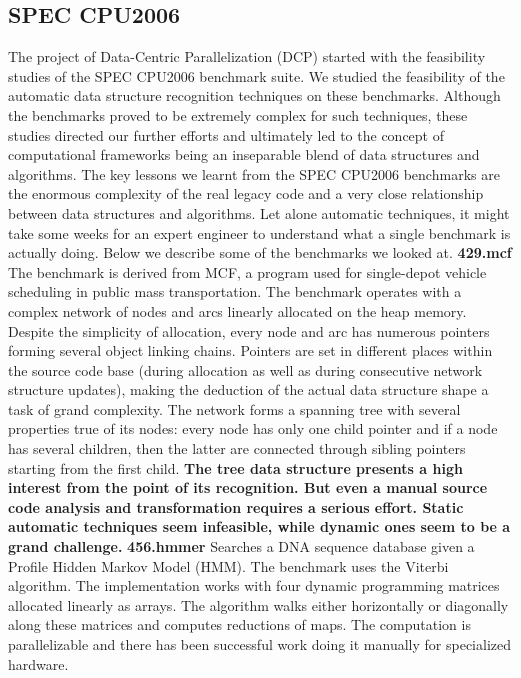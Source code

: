 \subsection{SPEC CPU2006}
\label{background_benchmarks_spec}
\quad The project of Data-Centric Parallelization (DCP) started with the feasibility studies of the SPEC CPU2006 benchmark suite. We studied the feasibility of the automatic data structure recognition techniques on these benchmarks. Although the benchmarks proved to be extremely complex for such techniques, these studies directed our further efforts and ultimately led to the concept of computational frameworks being an inseparable blend of data structures and algorithms. The key lessons we learnt from the SPEC CPU2006 benchmarks are the enormous complexity of the real legacy code and a very close relationship between data structures and algorithms. Let alone automatic techniques, it might take some weeks for an expert engineer to understand what a single benchmark is actually doing. Below we describe some of the benchmarks we looked at.\newline\null
\quad \textbf{429.mcf} \quad The benchmark is derived from MCF, a program used for single-depot vehicle scheduling in public mass transportation. The benchmark operates with a complex network of nodes and arcs linearly allocated on the heap memory. Despite the simplicity of allocation, every node and arc has numerous pointers forming several object linking chains. Pointers are set in different places within the source code base (during allocation as well as during consecutive network structure updates), making the deduction of the actual data structure shape a task of grand complexity. The network forms a spanning tree with several properties true of its nodes: every node has only one child pointer and if a node has several children, then the latter are connected through sibling pointers starting from the first child.\newline\null
\quad\textbf{The tree data structure presents a high interest from the point of its recognition. But even a manual source code analysis and transformation requires a serious effort. Static automatic techniques seem infeasible, while dynamic ones seem to be a grand challenge.}\newline\null
\quad \textbf{456.hmmer} \quad Searches a DNA sequence database given a Profile Hidden Markov Model (HMM). The benchmark uses the Viterbi algorithm. The implementation works with four dynamic programming matrices allocated linearly as arrays. The algorithm walks either horizontally or diagonally along these matrices and computes reductions of maps. The computation is parallelizable and there has been successful work \cite{Ganesan:2010:AHG:1854776.1854844}\cite{inria} doing it manually for specialized hardware.\newline\null

